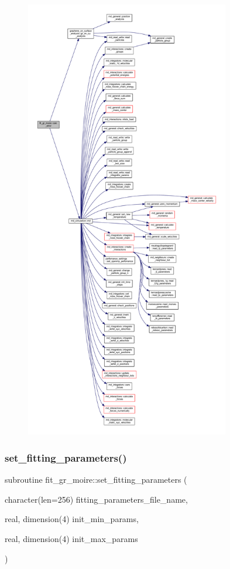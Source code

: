 \begin{figure}[H]
\begin{center}
\leavevmode
\includegraphics[height=550pt]{namespacefit__gr__moire_aafdddfaa3c2b90a3ab2c09735bc5068b_cgraph}
\end{center}
\end{figure}
\mbox{\label{namespacefit__gr__moire_a68bd3fd9fb813f29fb1ba6ad58c05a9d}} 
\subsubsection{\texorpdfstring{set\+\_\+fitting\+\_\+parameters()}{set\_fitting\_parameters()}}
{\footnotesize\ttfamily subroutine fit\+\_\+gr\+\_\+moire\+::set\+\_\+fitting\+\_\+parameters (\begin{DoxyParamCaption}\item[{character(len=256)}]{fitting\+\_\+parameters\+\_\+file\+\_\+name,  }\item[{real, dimension(4)}]{init\+\_\+min\+\_\+params,  }\item[{real, dimension(4)}]{init\+\_\+max\+\_\+params }\end{DoxyParamCaption})}



